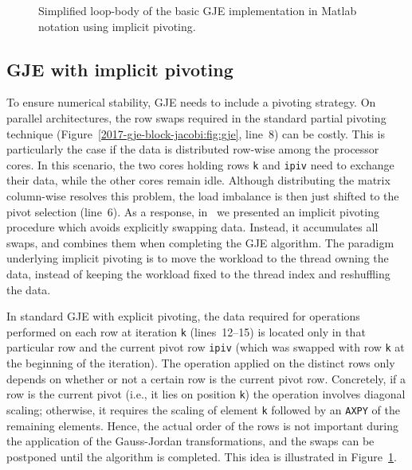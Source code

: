 \begin{figure}
\begin{center}
\begin{minipage}{\columnwidth}
{\small

}
\end{minipage}
\caption{Simplified loop-body of the basic GJE implementation in Matlab
    notation using implicit pivoting.}
\label{2017-gje-block-jacobi:fig:gje2}
\end{center}
\end{figure}

\subsection{GJE with implicit pivoting}\label{2017-gje-block-jacobi:sec:implicit-pivoting}
To ensure numerical stability, GJE needs to {include} a pivoting strategy.
On parallel architectures, the row swaps required
in the standard partial pivoting technique (Figure~\ref{2017-gje-block-jacobi:fig:gje}, line~8)
can be costly.
This is particularly the case if the data is distributed row-wise
among the processor cores.
In this {scenario}, the two cores holding rows \texttt{k} and \texttt{ipiv}
need to exchange their data, while the other cores remain idle.
Although distributing the matrix column-wise resolves this problem,
the load imbalance is then just shifted to the pivot selection (line~6).
As a response, in~\cite{Anzt:2017:BGE:3026937.3026940}
we {presented} an implicit pivoting procedure
which avoids explicitly swapping data.
Instead, it accumulates all swaps, and combines them
when completing the GJE algorithm.
The paradigm underlying implicit pivoting is to move the {workload to the thread owning the data}, instead of 
keeping the workload fixed to the thread index and reshuffling the data.

In {standard GJE with} explicit pivoting, the data required for operations 
performed on each row at iteration \texttt{k} (lines~12--15)
is located only in that particular row
and the current pivot row \texttt{ipiv}
(which was swapped with row \texttt{k} at the beginning of the iteration).
The operation applied on the distinct rows only depends
on whether or not a certain row is the current pivot row.
{Concretely}, if a row is the current pivot (i.e., it lies on position \texttt{k})
the operation involves diagonal scaling;
otherwise, it requires the scaling of element \texttt{k} followed by an \texttt{AXPY}
of the remaining elements.
Hence, the actual order of the rows
is not important during the application of the Gauss-Jordan transformations,
and the swaps can be postponed until the algorithm is completed.
This idea is illustrated in Figure~\ref{2017-gje-block-jacobi:fig:gje2}.


